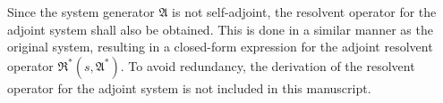 Since the system generator $\mathfrak{A}$ is not self-adjoint, the resolvent operator for the adjoint system shall also be obtained. This is done in a similar manner as the original system, resulting in a closed-form expression for the adjoint resolvent operator $\mathfrak{R}^*(s, \mathfrak{A}^*)$. To avoid redundancy, the derivation of the resolvent operator for the adjoint system is not included in this manuscript.





